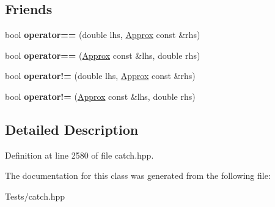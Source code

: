 \subsection*{Friends}
\begin{DoxyCompactItemize}
\item 
\mbox{\label{class_catch_1_1_detail_1_1_approx_ac766f044f1c63f0c5997982baefd9049}} 
bool {\bfseries operator==} (double lhs, \hyperlink{class_catch_1_1_detail_1_1_approx}{Approx} const \&rhs)
\item 
\mbox{\label{class_catch_1_1_detail_1_1_approx_a35999631e6cef569f9da9f3fa910db22}} 
bool {\bfseries operator==} (\hyperlink{class_catch_1_1_detail_1_1_approx}{Approx} const \&lhs, double rhs)
\item 
\mbox{\label{class_catch_1_1_detail_1_1_approx_a83b3763569a7ecc143c335b630be0e47}} 
bool {\bfseries operator!=} (double lhs, \hyperlink{class_catch_1_1_detail_1_1_approx}{Approx} const \&rhs)
\item 
\mbox{\label{class_catch_1_1_detail_1_1_approx_a7497ef839f8026cc0edd6269a80f3e09}} 
bool {\bfseries operator!=} (\hyperlink{class_catch_1_1_detail_1_1_approx}{Approx} const \&lhs, double rhs)
\end{DoxyCompactItemize}


\subsection{Detailed Description}


Definition at line 2580 of file catch.\+hpp.



The documentation for this class was generated from the following file\+:\begin{DoxyCompactItemize}
\item 
Tests/catch.\+hpp\end{DoxyCompactItemize}
